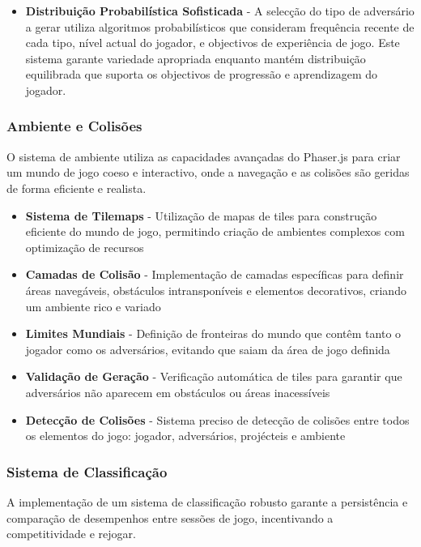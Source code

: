 \begin{itemize}
  \item \textbf{Distribuição Probabilística Sofisticada} - A selecção do tipo de adversário a gerar utiliza algoritmos probabilísticos que consideram frequência recente de cada tipo, nível actual do jogador, e objectivos de experiência de jogo. Este sistema garante variedade apropriada enquanto mantém distribuição equilibrada que suporta os objectivos de progressão e aprendizagem do jogador.
\end{itemize}

\subsubsection{Ambiente e Colisões}
\hspace{2em} O sistema de ambiente utiliza as capacidades avançadas do Phaser.js para criar um mundo de jogo coeso e interactivo, onde a navegação e as colisões são geridas de forma eficiente e realista.

\begin{itemize}
  \item \textbf{Sistema de Tilemaps} - Utilização de mapas de tiles para construção eficiente do mundo de jogo, permitindo criação de ambientes complexos com optimização de recursos
  \item \textbf{Camadas de Colisão} - Implementação de camadas específicas para definir áreas navegáveis, obstáculos intransponíveis e elementos decorativos, criando um ambiente rico e variado
  \item \textbf{Limites Mundiais} - Definição de fronteiras do mundo que contêm tanto o jogador como os adversários, evitando que saiam da área de jogo definida
  \item \textbf{Validação de Geração} - Verificação automática de tiles para garantir que adversários não aparecem em obstáculos ou áreas inacessíveis
  \item \textbf{Detecção de Colisões} - Sistema preciso de detecção de colisões entre todos os elementos do jogo: jogador, adversários, projécteis e ambiente
\end{itemize}

\subsubsection{Sistema de Classificação}
\hspace{2em} A implementação de um sistema de classificação robusto garante a persistência e comparação de desempenhos entre sessões de jogo, incentivando a competitividade e rejogar.

